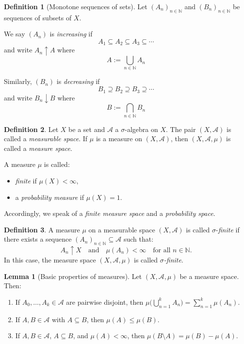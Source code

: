 \documentclass[12pt]{article}
\theoremstyle{definition}
\newtheorem{definition}{Definition}[section]
\newtheorem{lemma}[theorem]{Lemma}
\begin{document}
\medskip
\begin{definition}[Monotone sequences of sets]
Let \((A_n)_{n \in \mathbb{N}}\) and \((B_n)_{n \in \mathbb{N}}\) be sequences of subsets of \(X\).

We say \((A_n)\) is \emph{increasing} if 
\[
A_1 \subseteq A_2 \subseteq A_3 \subseteq \cdots
\]
and write \(A_n \uparrow A\) where
\[
A := \bigcup_{n \in \mathbb{N}} A_n
\]

Similarly, \((B_n)\) is \emph{decreasing} if
\[
B_1 \supseteq B_2 \supseteq B_3 \supseteq \cdots
\]
and write \(B_n \downarrow B\) where
\[
B := \bigcap_{n \in \mathbb{N}} B_n
\]
\end{definition}


\medskip
\begin{definition}
Let \(X\) be a set and \(\mathcal{A}\) a \(\sigma\)-algebra on \(X\). The pair \((X, \mathcal{A})\) is called a \emph{measurable space}.  
If \(\mu\) is a measure on \((X, \mathcal{A})\), then \((X, \mathcal{A}, \mu)\) is called a \emph{measure space}.

\medskip

A measure \(\mu\) is called:
\begin{itemize}
  \item \emph{finite} if \(\mu(X) < \infty\),
  \item a \emph{probability measure} if \(\mu(X) = 1\).
\end{itemize}

Accordingly, we speak of a \emph{finite measure space} and a \emph{probability space}.
\end{definition}


\medskip
\begin{definition}
A measure \(\mu\) on a measurable space \((X, \mathcal{A})\) is called \(\sigma\)-\emph{finite} if there exists a sequence \((A_n)_{n \in \mathbb{N}} \subseteq \mathcal{A}\) such that:
\[
A_n \uparrow X \quad \text{and} \quad \mu(A_n) < \infty \quad \text{for all } n \in \mathbb{N}.
\]
In this case, the measure space \((X, \mathcal{A}, \mu)\) is called \emph{\(\sigma\)-finite}.
\end{definition}


\medskip
\begin{lemma}[Basic properties of measures]
Let \((X,\mathcal{A},\mu)\) be a measure space. Then:
\renewcommand{\labelenumi}{(\roman{enumi})}
\begin{enumerate}
    \item If \(A_0, \ldots, A_k \in \mathcal{A}\) are pairwise disjoint, then \(\mu\big(\bigcup_{n=1}^k A_n\big) = \sum_{n=1}^k \mu(A_n)\).
    \item If \(A, B \in \mathcal{A}\) with \(A \subseteq B\), then \(\mu(A) \leq \mu(B)\).
    \item If \(A, B \in \mathcal{A}\), \(A \subseteq B\), and \(\mu(A) < \infty\), then \(\mu(B \setminus A) = \mu(B) - \mu(A)\).
\end{enumerate}
\end{lemma}
\end{document}
